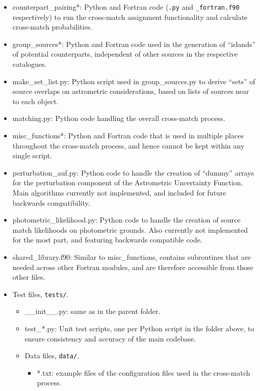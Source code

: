 \documentclass[a4paper,11pt]{scrartcl}
\begin{document}
\begin{itemize}
\begin{itemize}
		\item counterpart\_pairing*: Python and Fortran code (\texttt{.py} and \texttt{\_fortran.f90} respectively) to run the cross-match assignment functionality and calculate cross-match probabilities.
		\item group\_sources*: Python and Fortran code used in the generation of ``islands'' of potential counterparts, independent of other sources in the respective catalogues.
		\item make\_set\_list.py: Python script used in group\_sources.py to derive ``sets'' of source overlaps on astrometric considerations, based on lists of sources near to each object.
		\item matching.py: Python code handling the overall cross-match process.
		\item misc\_functions*: Python and Fortran code that is used in multiple places throughout the cross-match process, and hence cannot be kept within any single script.
		\item perturbation\_auf.py: Python code to handle the creation of ``dummy'' arrays for the perturbation component of the Astrometric Uncertainty Function. Main algorithms currently not implemented, and included for future backwards compatibility.
		\item photometric\_likelihood.py: Python code to handle the creation of source match likelihoods on photometric grounds. Also currently not implemented for the most part, and featuring backwards compatible code.
		\item shared\_library.f90: Similar to misc\_functions, contains subroutines that are needed across other Fortran modules, and are therefore accessible from those other files.
		\item Test files, \texttt{tests/}.
		\begin{itemize}
			\item \_\_init\_\_.py: same as in the parent folder.
			\item test\_*.py: Unit test scripts, one per Python script in the folder above, to ensure consistency and accuracy of the main codebase.
			\item Data files, \texttt{data/}.
			\begin{itemize}
				\item *.txt: example files of the configuration files used in the cross-match process.
			\end{itemize}
		\end{itemize}
	\end{itemize}
\end{itemize}
\end{document}
